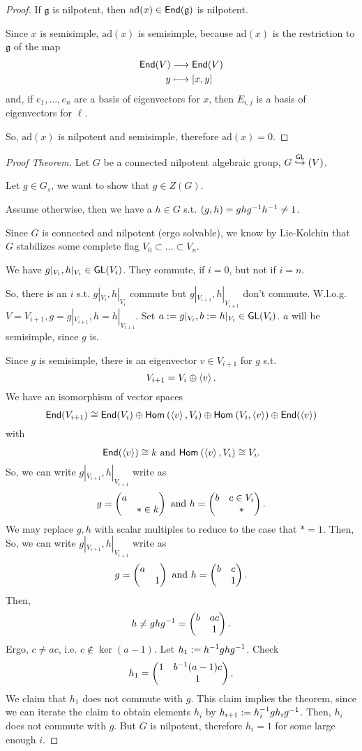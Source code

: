 \begin{proof}
If $\mathfrak{g}$ is nilpotent, then $\mathrm{ad}(x) \in \textsf{End}(\mathfrak{g})$ is nilpotent.

Since $x$ is semisimple, $\mathrm{ad}(x)$ is semisimple, because $\mathrm{ad}(x)$ is the restriction to $\mathfrak{g}$ of the map
\begin{align*}
\textsf{End}(V) & \overset{}{\longrightarrow} \textsf{End}(V)\\
y & \longmapsto [x,y]
\end{align*}
and, if $e_1, \ldots, e_n$ are a basis of eigenvectors for $x$, then $E_{i,j}$ is a basis of eigenvectors for $\ell$.

So, $\mathrm{ad}(x)$ is nilpotent and semisimple, therefore $\mathrm{ad}(x) = 0$.
\end{proof}

\begin{proof}[Proof Theorem]
	Let $G$ be a connected nilpotent algebraic group, $G \overset{\textsf{GL}}{\hookrightarrow}(V)$.
	
	Let $g \in G_s$, we want to show that $g \in Z(G)$.
	
	Assume otherwise, then we have a $h \in G$ s.t. $(g,h) = ghg^{-1} h^{-1} \neq 1$.
	
	Since $G$ is connected and nilpotent (ergo solvable), we know by Lie-Kolchin that $G$ stabilizes some complete flag $V_0 \subset \ldots \subset V_n$.
	
	We have $g|_{V_i}, h|_{V_i} \in \textsf{GL}(V_i)$. They commute, if $i = 0$, but not if $i = n$.
	
	So, there is an $i$ s.t. $g|_{V_i}, h|_{V_i}$ commute but  $g|_{V_{i+1}}, h|_{V_{i+1}}$ don't commute. W.l.o.g. $V =V_{i+1}, g = g|_{V_{i+1}}, h = h|_{V_{i+1}}$.
	Set $a:= g|_{V_i}, b:=  h|_{V_i} \in \textsf{GL}(V_i)$. $a$ will be semisimple, since $g$ is.
	
	Since $g$ is semisimple, there is an eigenvector $v \in V_{i+1}$ for $g$ s.t.
	\[ V_{i+1} = V_i \oplus \left<v\right>. \]
	We have an isomorphism of vector spaces
	\[ \textsf{End}(V_{i+1}) \overset{}{\cong} \textsf{End}(V_i) \oplus \textsf{Hom}_{}\left(\left<v\right>, V_i\right) \oplus \textsf{Hom}_{}\left(V_i, \left<v\right>\right) \oplus \textsf{End}(\left<v\right>) \]
	with
	\[ \textsf{End}(\left<v\right>) \overset{}{\cong} k \text{  and  } \textsf{Hom}_{}\left(\left<v\right>, V_i\right) \overset{}{\cong} V_i. \]
	So, we can write $ g|_{V_{i+1}},   h|_{V_{i+1}}$ write as
	\[
	g = \left(\begin{matrix} a \\ & * \in k \end{matrix}\right) \text{  and  } 	h = \left(\begin{matrix} b & c \in V_i \\ & *  \end{matrix}\right).
	\]
	We may replace $g,h$ with scalar multiples to reduce to the case that $* = 1$. Then,
		So, we can write $ g|_{V_{i+1}},   h|_{V_{i+1}}$ write as
	\[
	g = \left(\begin{matrix} a \\ & 1 \end{matrix}\right) \text{  and  } 	h = \left(\begin{matrix} b & c  \\ & 1  \end{matrix}\right).
	\]
	Then,
	\[ h\neq ghg^{-1} = \left(\begin{matrix} b & ac \\ & 1 \end{matrix}\right). \]
	Ergo, $c \neq ac$, i.e. $c \notin \ker(a -1)$. Let $h_1 := h^{-1} gh g^{-1}$. Check
	\[ h_1 = \left(\begin{matrix} 
	1 & b^{-1}(a-1)c\\ & 1 \end{matrix}\right). \]
We claim that $h_1$ does not commute with $g$. This claim implies the theorem, since we can iterate the claim to obtain elements $h_i$ by $h_{i+1} := h_i^{-1} g h_i g^{-1}$. Then, $h_i$ does not commute with $g$. But $G$ is nilpotent, therefore $h_i = 1$ for some large enough $i$.


\end{proof}
